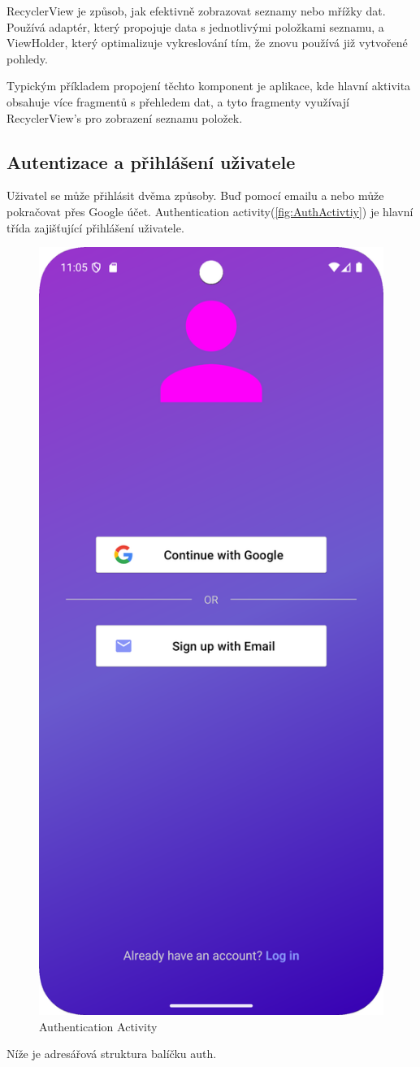 RecyclerView je způsob, jak efektivně zobrazovat seznamy nebo mřížky dat. Používá adaptér, který propojuje data s jednotlivými položkami seznamu, a ViewHolder, který optimalizuje vykreslování tím, že znovu používá již vytvořené pohledy.  

Typickým příkladem propojení těchto komponent je aplikace, kde hlavní aktivita obsahuje více fragmentů s přehledem dat, a tyto fragmenty využívají RecyclerView's pro zobrazení seznamu položek.  

\newpage

\subsection{Autentizace a přihlášení uživatele}
\hspace{14pt} Uživatel se může přihlásit dvěma způsoby. Buď pomocí emailu a nebo může pokračovat přes Google účet. Authentication activity(\autoref{fig:AuthActivtiy}) je hlavní třída zajišťující přihlášení uživatele. 
\\ 
\begin{figure}[H]
    \centering
    \includegraphics[width=0.4\linewidth]{images/auth.png}
    \caption{Authentication Activity}
    \label{fig:AuthActivtiy}
\end{figure}
Níže je adresářová struktura balíčku auth.
\\

